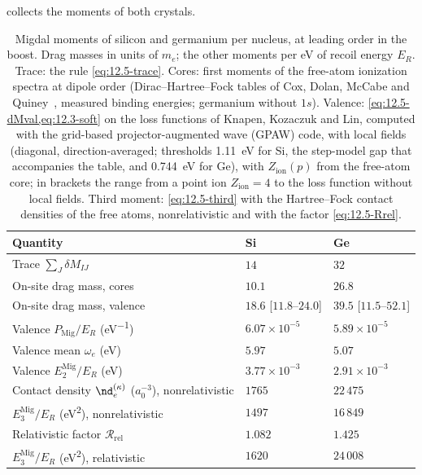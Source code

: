  collects the moments of both crystals.
\begin{table}[tbp]
  \centering
  \small
  \caption{Migdal moments of silicon and germanium per nucleus, at leading order in the boost. Drag masses in units of $m_e$; the other moments per eV of recoil energy $E_R$. Trace: the rule \cref{eq:12.5-trace}. Cores: first moments of the free-atom ionization spectra at dipole order (Dirac--Hartree--Fock tables of Cox, Dolan, McCabe and Quiney~\cite{cox2023precise}, measured binding energies; germanium without $1s$). Valence: \cref{eq:12.5-dMval,eq:12.3-soft} on the loss functions of Knapen, Kozaczuk and Lin, computed with the grid-based projector-augmented wave (GPAW) code, with local fields (diagonal, direction-averaged; thresholds \SI{1.11}{eV} for Si, the step-model gap that accompanies the table, and \SI{0.744}{eV} for Ge), with $Z_{\mathrm{ion}}(p)$ from the free-atom core; in brackets the range from a point ion $Z_{\mathrm{ion}} = 4$ to the loss function without local fields. Third moment: \cref{eq:12.5-third} with the Hartree--Fock contact densities of the free atoms, nonrelativistic and with the factor \cref{eq:12.5-Rrel}.}
  \label{tab:12-moments}
  \begin{tabular}{@{}lll@{}}
    \toprule
    Quantity & Si & Ge \\
    \midrule
    Trace $\sum_J\delta M_{IJ}$ & $14$ & $32$ \\
    On-site drag mass, cores & $10.1$ & $26.8$ \\
    On-site drag mass, valence & $18.6$ [$11.8$--$24.0$] & $39.5$ [$11.5$--$52.1$] \\
    Valence $P_{\mathrm{Mig}}/E_R$ (\si{eV^{-1}}) & $6.07\times10^{-5}$ & $5.89\times10^{-5}$ \\
    Valence mean $\omega_e$ (\si{eV}) & $5.97$ & $5.07$ \\
    Valence $E^{\mathrm{Mig}}_2/E_R$ (\si{eV}) & $3.77\times10^{-3}$ & $2.91\times10^{-3}$ \\
    Contact density $\nd_e^{(\kappa)}$ ($a_0^{-3}$), nonrelativistic & $1765$ & $22\,475$ \\
    $E^{\mathrm{Mig}}_3/E_R$ (\si{eV^2}), nonrelativistic & $1497$ & $16\,849$ \\
    Relativistic factor $\mathcal{R}_{\mathrm{rel}}$ & $1.082$ & $1.425$ \\
    $E^{\mathrm{Mig}}_3/E_R$ (\si{eV^2}), relativistic & $1620$ & $24\,008$ \\
    \bottomrule
  \end{tabular}
\end{table}

